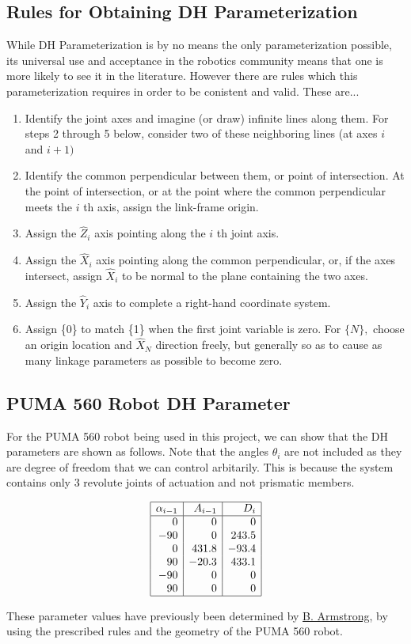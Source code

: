 \subsection*{Rules for Obtaining DH Parameterization}
While DH Parameterization is by no means the only parameterization possible, its universal use and acceptance in the robotics community means that one is more likely to see it in the literature. However there are rules which this parameterization requires in order to be conistent and valid. These are...


\begin{enumerate}
  \item Identify the joint axes and imagine (or draw) infinite lines along them. For steps 2 through 5 below, consider two of these neighboring lines (at axes $i$ and $i+1)$
  \item Identify the common perpendicular between them, or point of intersection. At the point of intersection, or at the point where the common perpendicular meets the $i$ th axis, assign the link-frame origin.
  \item Assign the $\hat{Z}_{i}$ axis pointing along the $i$ th joint axis.
  \item Assign the $\hat{X}_{i}$ axis pointing along the common perpendicular, or, if the axes intersect, assign $\hat{X}_{i}$ to be normal to the plane containing the two axes.
  \item Assign the $\hat{Y}_{i}$ axis to complete a right-hand coordinate system.
  \item Assign \{0\} to match \{1\} when the first joint variable is zero. For $\{N\},$ choose an origin location and $\hat{X}_{N}$ direction freely, but generally so as to cause as many linkage parameters as possible to become zero.
\end{enumerate}



\subsection*{PUMA 560 Robot DH Parameter}

For the PUMA 560 robot being used in this project, we can show that the DH parameters are shown as follows. Note that the angles $\theta_i$ are not included as they are degree of freedom that we can control arbitarily. This is because the system contains only 3 revolute joints of actuation and not prismatic members.

\begin{center}
$$
  \begin{array}{|r|r|r|}
  \hline \alpha_{i-1} & A_{i-1} & D_{i} \\
  \hline 0 & 0 & 0 \\
  -90 & 0 & 243.5 \\
  0 & 431.8 & -93.4 \\
  90 & -20.3 & 433.1 \\
  -90 & 0 & 0 \\
  90 & 0 & 0 \\
  \hline
  \end{array}
$$
\end{center}

\noindent These parameter values have previously been determined by \underline{B. Armstrong}, by using the prescribed rules and the geometry of the PUMA 560 robot.
